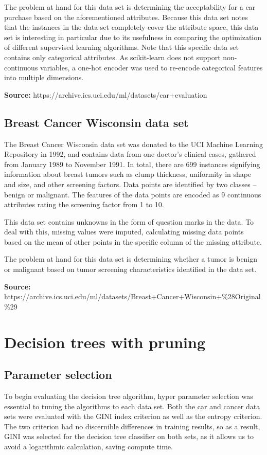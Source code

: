 \documentclass{article}
\begin{document}
    The problem at hand for this data set is determining the acceptability for a car purchase based on the aforementioned attributes. Because this data set notes that the instances in the data set completely cover the attribute space, this data set is interesting in particular due to its usefulness in comparing the optimization of different supervised learning algorithms. Note that this specific data set contains only categorical attributes. As scikit-learn does not support non-continuous variables, a one-hot encoder was used to re-encode categorical features into multiple dimensions.

    \textbf{Source:} https://archive.ics.uci.edu/ml/datasets/car+evaluation

    \subsection{Breast Cancer Wisconsin data set}
    The Breast Cancer Wisconsin data set was donated to the UCI Machine Learning Repository in 1992, and contains data from one doctor's clinical cases, gathered from January 1989 to November 1991. In total, there are 699 instances signifying information about breast tumors such as clump thickness, uniformity in shape and size, and other screening factors. Data points are identified by two classes -- benign or malignant. The features of the data points are encoded as 9 continuous attributes rating the screening factor from 1 to 10.

    This data set contains unknowns in the form of question marks in the data. To deal with this, missing values were imputed, calculating missing data points based on the mean of other points in the specific column of the missing attribute. 

    The problem at hand for this data set is determining whether a tumor is benign or malignant based on tumor screening characteristics identified in the data set.

    \textbf{Source:} https://archive.ics.uci.edu/ml/datasets/Breast+Cancer+Wisconsin+\%28Original\%29

    \section{Decision trees with pruning}

    \subsection{Parameter selection}
    To begin evaluating the decision tree algorithm, hyper parameter selection was essential to tuning the algorithms to each data set. Both the car and cancer data sets were evaluated with the GINI index criterion as well as the entropy criterion. The two criterion had no discernible differences in training results, so as a result, GINI was selected for the decision tree classifier on both sets, as it allows us to avoid a logarithmic calculation, saving compute time.
\end{document}
